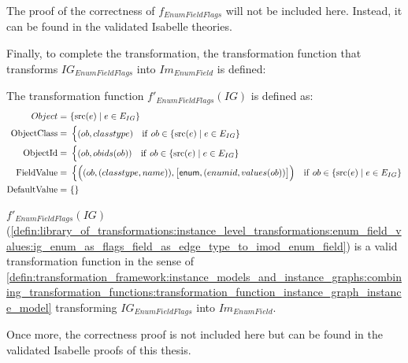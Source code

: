 The proof of the correctness of $f_{EnumFieldFlags}$ will not be included here. Instead, it can be found in the validated Isabelle theories.

Finally, to complete the transformation, the transformation function that transforms $IG_{EnumFieldFlags}$ into $Im_{EnumField}$ is defined:

\begin{defin}
\label{defin:library_of_transformations:instance_level_transformations:enum_field_values:ig_enum_as_flags_field_as_edge_type_to_imod_enum_field}
The transformation function $f'_{EnumFieldFlags}(IG)$ is defined as:
\begin{align*}
Object =\ &\{\mathrm{src}(e) \mid e \in E_{IG}\} \\
\mathrm{ObjectClass} =\ & \begin{cases}
    (ob, classtype) & \mathrm{if }\ ob \in \{\mathrm{src}(e) \mid e \in E_{IG}\}
\end{cases}\\
\mathrm{ObjectId} =\ & \begin{cases}
    (ob, obids(ob)) & \mathrm{if }\ ob \in \{\mathrm{src}(e) \mid e \in E_{IG}\}
\end{cases}\\
\mathrm{FieldValue} =\ & \begin{cases}
    \Big((ob, (classtype, name)), \big[\mathsf{enum}, (enumid, values(ob))\big]\Big) & \mathrm{if }\ ob \in \{\mathrm{src}(e) \mid e \in E_{IG}\}
\end{cases} \\
\mathrm{DefaultValue} =\ & \{\}
\end{align*}
\end{defin}

\begin{thm}
\label{defin:library_of_transformations:instance_level_transformations:enum_field_values:ig_enum_as_flags_field_as_edge_type_to_tmod_class_func}
$f'_{EnumFieldFlags}(IG)$ (\cref{defin:library_of_transformations:instance_level_transformations:enum_field_values:ig_enum_as_flags_field_as_edge_type_to_imod_enum_field}) is a valid transformation function in the sense of \cref{defin:transformation_framework:instance_models_and_instance_graphs:combining_transformation_functions:transformation_function_instance_graph_instance_model} transforming $IG_{EnumFieldFlags}$ into $Im_{EnumField}$.
\end{thm}

Once more, the correctness proof is not included here but can be found in the validated Isabelle proofs of this thesis.